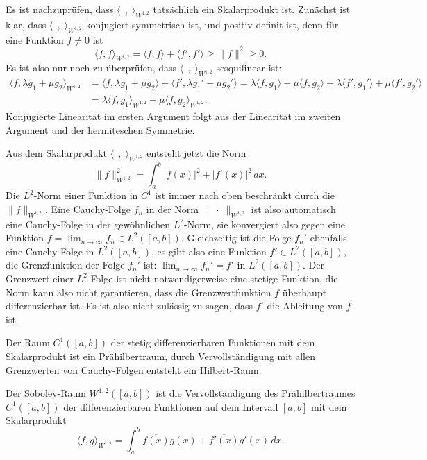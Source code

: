 Es ist nachzuprüfen, dass $\langle\;\,,\;\rangle_{W^{1,2}}$ tatsächlich ein
Skalarprodukt ist.
Zunächst ist klar, dass $\langle\;\,,\;\rangle_{W^{1,2}}$ konjugiert
symmetrisch ist, und positiv definit ist, denn für eine Funktion $f\ne 0$
ist
\[
\langle f,f\rangle_{W^{1,2}}
=
\langle f,f\rangle + \langle f',f'\rangle
\ge
\|f\|^2
\ge
0.
\]
Es ist also nur noch zu überprüfen, dass $\langle\;\,,\;\rangle_{W^{1,2}}$ 
sesquilinear ist:
\begin{align*}
\langle f,\lambda g_1+\mu g_2\rangle_{W^{1,2}}
&=
\langle f,\lambda g_1+\mu g_2\rangle + \langle f',\lambda g_1'+\mu g_2'\rangle
=
\lambda \langle f,g_1\rangle
+
\mu \langle f,g_2\rangle
+
\lambda \langle f',g_1'\rangle
+
\mu \langle f',g_2'\rangle
\\
&=
\lambda \langle f,g_1\rangle_{W^{1,2}}
+
\mu \langle f,g_2\rangle_{W^{1,2}}.
\end{align*}
Konjugierte Linearität im ersten Argument folgt aus der Linearität
im zweiten Argument und der hermiteschen Symmetrie.

Aus dem Skalarprodukt $\langle\;\,,\;\rangle_{W^{1,2}}$ entsteht jetzt
die Norm
\[
\|f\|_{W^{1,2}}^2
=
\int_a^b |f(x)|^2 + |f'(x)|^2 \,dx.
\]
Die $L^2$-Norm einer Funktion in $C^1$ ist immer nach oben beschränkt
durch die $\|f\|_{W^{1,2}}$.
Eine Cauchy-Folge $f_n$ in der Norm $\|\;\cdot\;\|_{W^{1,2}}$ ist also
automatisch eine Cauchy-Folge in der gewöhnlichen $L^2$-Norm, sie
konvergiert also gegen eine Funktion $f=\lim_{n\to\infty} f_n \in L^2([a,b])$.
Gleichzeitig ist die Folge $f_n'$ ebenfalls eine Cauchy-Folge
in $L^2([a,b])$, es gibt also eine Funktion $f'\in L^2([a,b])$,
die Grenzfunktion der Folge $f_n'$ ist: $\lim_{n\to\infty} f_n' = f'$
in $L^2([a,b])$.
Der Grenzwert einer $L^2$-Folge ist nicht notwendigerweise eine
stetige Funktion, die Norm kann also nicht garantieren, dass die
Grenzwertfunktion $f$ überhaupt differenzierbar ist.
Es ist also nicht zulässig zu sagen, dass $f'$ die Ableitung von $f$
ist.

Der Raum $C^1([a,b])$ der stetig differenzierbaren Funktionen mit
dem Skalarprodukt ist ein Prähilbertraum, durch Vervollständigung mit
allen Grenzwerten von Cauchy-Folgen entsteht ein Hilbert-Raum.

\begin{definition}
Der Sobolev-Raum $W^{1,2}([a,b])$ ist die Vervollständigung des
Prähilbertraumes $C^1([a,b])$ der differenzierbaren Funktionen auf
dem Intervall $[a,b]$ mit dem Skalarprodukt
\[
\langle f,g\rangle_{W^{1,2}}
=
\int_a^b \overline{f(x)}g(x) + \overline{f'(x)}g'(x)\,dx.
\]
\end{definition}


